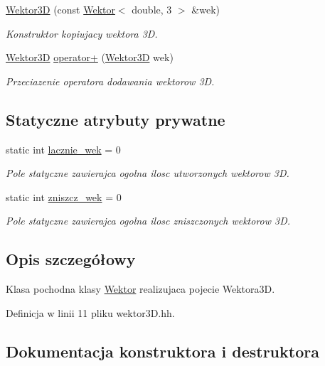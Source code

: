 \begin{DoxyCompactItemize}
\hyperlink{class_wektor3_d_a8e06c5739cc4ec3fe97177269872efd2}{Wektor3D} (const \hyperlink{class_wektor}{Wektor}$<$ double, 3 $>$ \&wek)
\begin{DoxyCompactList}\small\item\em Konstruktor kopiujacy wektora 3D. \end{DoxyCompactList}\item 
\hyperlink{class_wektor3_d}{Wektor3D} \hyperlink{class_wektor3_d_a73141c168ee82a84e4522d12aae25bf1}{operator+} (\hyperlink{class_wektor3_d}{Wektor3D} wek)
\begin{DoxyCompactList}\small\item\em Przeciazenie operatora dodawania wektorow 3D. \end{DoxyCompactList}\end{DoxyCompactItemize}
\subsection*{Statyczne atrybuty prywatne}
\begin{DoxyCompactItemize}
\item 
static int \hyperlink{class_wektor3_d_a0e760007c5a0cb91ddc981879191212a}{lacznie\+\_\+wek} = 0
\begin{DoxyCompactList}\small\item\em Pole statyczne zawierajca ogolna ilosc utworzonych wektorow 3D. \end{DoxyCompactList}\item 
static int \hyperlink{class_wektor3_d_a3977f6ad24d6653c8b22feaf69bc3ed2}{zniszcz\+\_\+wek} = 0
\begin{DoxyCompactList}\small\item\em Pole statyczne zawierajca ogolna ilosc zniszczonych wektorow 3D. \end{DoxyCompactList}\end{DoxyCompactItemize}


\subsection{Opis szczegółowy}
Klasa pochodna klasy \hyperlink{class_wektor}{Wektor} realizujaca pojecie Wektora3D. 

Definicja w linii 11 pliku wektor3\+D.\+hh.



\subsection{Dokumentacja konstruktora i destruktora}
\mbox{\label{class_wektor3_d_a7c48a57fd36c0af29e26c825f90a973f}} 

